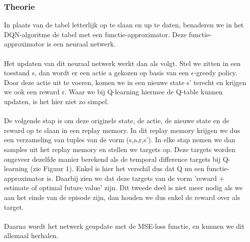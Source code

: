 \documentclass[11pt]{article}
\begin{document}
\subsubsection{Theorie}
In plaats van de tabel letterlijk op te slaan en up te daten, benaderen we in het DQN-algoritme de tabel met een functie-approximator. Deze functie-approximator is een neuraal netwerk.\\\\
Het updaten van dit neuraal netwerk werkt dan als volgt. Stel we zitten in een toestand s, dan wordt er een actie a gekozen op basis van een \(\epsilon\)-greedy policy. Door deze actie uit te voeren, komen we in een nieuwe state s' terecht en krijgen we ook een reward r. Waar we bij Q-learning hiermee de Q-table kunnen updaten, is het hier niet zo simpel. \\\\
De volgende stap is om deze originele state, de actie, de nieuwe state en de reward op te slaan in een replay memory. In dit replay memory krijgen we dus een verzameling van tuples van de vorm (s,a,r,s'). In elke stap nemen we dan samples uit het replay memory en stellen we targets op. Deze targets worden ongeveer dezelfde manier berekend als de temporal difference targets bij Q-learning (zie Figuur 1). Enkel is hier het verschil dus dat Q nu een functie-approximator is. Daarbij zien we dat deze targets van de vorm 'reward + estimate of optimal future value' zijn. Dit tweede deel is niet meer nodig als we aan het einde van de episode zijn, dan houden we dus enkel de reward over als target. \\\\
Daarna wordt het netwerk geupdate met de MSE-loss functie, en kunnen we dit allemaal herhalen.
\end{document}

